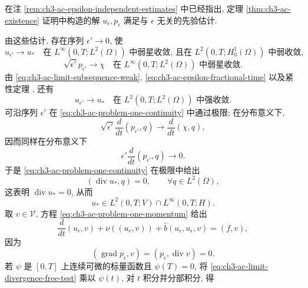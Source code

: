 \begin{Proof}
在注 \ref{rem:ch3-ac-epsilon-independent-estimates} 中已经指出, 定理 \ref{thm:ch3-ac-existence} 证明中构造的解 $u_\epsilon,p_\epsilon$ 满足与 $\epsilon$ 无关的先验估计.

\hypertarget{chapter-03-page-313}{}
由这些估计, 存在序列 $\epsilon'\to0$, 使
\begin{equation}
u_{\epsilon'}\longrightarrow u_*
\quad\text{在 }L^\infty(0,T;L^2(\Omega))\text{ 中弱星收敛, 且在 }
L^2(0,T;H_0^1(\Omega))\text{ 中弱收敛},
\label{eq:ch3-ac-limit-subsequence-weak}
\end{equation}
\begin{equation}
\sqrt{\epsilon'}p_{\epsilon'}\longrightarrow\chi
\quad\text{在 }L^\infty(0,T;L^2(\Omega))\text{ 中弱星收敛}.
\label{eq:ch3-ac-limit-scaled-pressure}
\end{equation}
由 \eqref{eq:ch3-ac-limit-subsequence-weak}, \eqref{eq:ch3-ac-epsilon-fractional-time} 以及紧性定理 , 还有
\begin{equation}
u_{\epsilon'}\longrightarrow u_*
\quad\text{在 }L^2(0,T;L^2(\Omega))\text{ 中强收敛}.
\label{eq:ch3-ac-limit-subsequence-strong}
\end{equation}
可沿序列 $\epsilon'$ 在 \eqref{eq:ch3-ac-problem-one-continuity} 中通过极限; 在分布意义下,
\[
\sqrt{\epsilon'}\frac d{dt}(p_{\epsilon'},q)
\longrightarrow\frac d{dt}(\chi,q),
\]
因而同样在分布意义下
\[
\epsilon'\frac d{dt}(p_{\epsilon'},q)\longrightarrow0.
\]
于是 \eqref{eq:ch3-ac-problem-one-continuity} 在极限中给出
\[
(\operatorname{div}u_*,q)=0,
\qquad\forall q\in L^2(\Omega),
\]
这表明 $\operatorname{div}u_*=0$, 从而
\begin{equation}
u_*\in L^2(0,T;V)\cap L^\infty(0,T;H).
\label{eq:ch3-ac-limit-divergence-free-space}
\end{equation}
取 $v\in\mathcal V$, 方程 \eqref{eq:ch3-ac-problem-one-momentum} 给出
\begin{equation}
\frac d{dt}(u_\epsilon,v)+\nu((u_\epsilon,v))
+\widehat b(u_\epsilon,u_\epsilon,v)=(f,v),
\label{eq:ch3-ac-limit-divergence-free-test}
\end{equation}
因为
\[
(\operatorname{grad}p_\epsilon,v)=(p_\epsilon,\operatorname{div}v)=0.
\]
若 $\psi$ 是 $[0,T]$ 上连续可微的标量函数且 $\psi(T)=0$, 将 \eqref{eq:ch3-ac-limit-divergence-free-test} 乘以 $\psi(t)$, 对 $t$ 积分并分部积分, 得
\begin{equation}

\end{equation}
\end{Proof}
